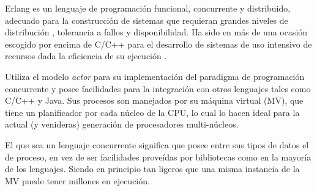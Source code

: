 
Erlang es un lenguaje de programación funcional, concurrente y
distribuido, adecuado para la construcción de sistemas que requieran grandes niveles de distribución \cite{veldstra:_welcom_erlan}, tolerancia a fallos y disponibilidad. Ha sido en más de una ocasión escogido por encima de C/C++ para el desarrollo de sistemas de uso intensivo de recursos \cite{Cesarini2009} dada la eficiencia de su ejecución \cite{erlang:future}. 

Utiliza el modelo {\em actor} para su implementación del paradigma de programación concurrente y posee facilidades para la integración con otros lenguajes tales como C/C++ y Java. Sus procesos son manejados por su máquina virtual (MV), que tiene un planificador por cada núcleo de la CPU, lo cual lo hacen ideal para la actual (y venideras) generación de procesadores multi-núcleos.

El que sea un lenguaje concurrente significa que posee entre sus tipos de datos el de proceso, en vez de ser facilidades proveídas por bibliotecas como en la mayoría de los lenguajes. Siendo en principio tan ligeros que una misma instancia de la MV puede tener millones en ejecución.